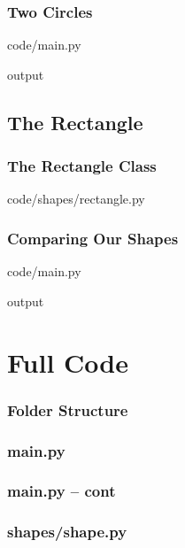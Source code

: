 \documentclass{beamer}
\newcommand{\closenewline}{%
  \par\nopagebreak
  \vspace{-\itemsep}
  \vspace{-\parsep}
}
\begin{document}
  \begin{frame}
    \frametitle{Two Circles}

    code/main.py
    

    output
    
  \end{frame}


\subsection{The Rectangle}
  \begin{frame}
    \frametitle{The Rectangle Class}
    code/shapes/rectangle.py
    
  \end{frame}

  \begin{frame}
    \frametitle{Comparing Our Shapes}

    code/main.py
    
    \closenewline
    

    output
    
    \closenewline
    
  \end{frame}

\appendix
\section{Full Code}
  \begin{frame}
    \frametitle{Folder Structure}
  \end{frame}

  \begin{frame}
    \frametitle{main.py}
    
  \end{frame}

  \begin{frame}
    \frametitle{main.py -- cont}
    
  \end{frame}

  \begin{frame}
    \frametitle{shapes/shape.py}
    
  \end{frame}
\end{document}
